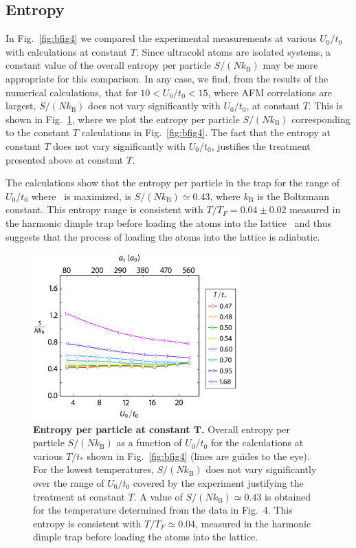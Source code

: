 \subsection{Entropy}


In Fig.~\ref{fig:bfig4} we compared the experimental measurements at various
$U_{0}/t_{0}$ with calculations at constant $T$.   Since ultracold atoms are
isolated systems, a constant value of the overall entropy per particle $S/(N
k_{\mathrm{B}})$ may be more appropriate for this comparison.  In any case,  we
find, from the results of the numerical calculations, that for
$10<U_{0}/t_{0}<15$, where AFM correlations are largest,  $S/(N
k_{\mathrm{B}})$ does not vary significantly with $U_{0}/t_{0}$, at constant
$T$.  This is shown in Fig.~\ref{fig:entropy-ED6}, where we plot the entropy
per particle $S/(Nk_{\mathrm{B}})$ corresponding to the constant $T$
calculations in Fig.~\ref{fig:bfig4}.  The fact that the entropy at constant
$T$ does not vary significantly with $U_{0}/t_{0}$, justifies the treatment
presented above at constant $T$. 
 
The calculations show that the entropy per particle in the trap for the range
of $U_{0}/t_{0}$ where \sPi\ is maximized,  is $S/(Nk_{\mathrm{B}})\simeq0.43$,
where $k_{\mathrm{B}}$ is the Boltzmann constant.  This entropy range is
consistent with $T/T_{F}=0.04\pm0.02$ measured in the harmonic dimple trap
before loading the atoms into the lattice~\cite{Kohl2006} and thus suggests
that the process of loading the atoms into the lattice is adiabatic. 

\begin{figure}
\centering \includegraphics[width=80mm]{../figures/afmpaper/Hulet_EDfig6.png}
\caption{\textbf{Entropy per particle at constant $\bm{T}$.} Overall entropy
per particle $S/(Nk_{\mathrm{B}})$ as a function of $U_{0}/t_{0}$ for the
calculations at various $T/t_{*}$ shown in Fig.~\ref{fig:bfig4} (lines are
guides to the eye).  For the lowest temperatures, $S/(Nk_{\mathrm{B}})$ does
not vary significantly over the range of $U_{0}/t_{0}$ covered by the
experiment justifying the treatment at constant $T$.   A value of
$S/(Nk_{\mathrm{B}})\simeq0.43$ is obtained for the temperature determined from
the data in Fig.~4. This entropy is consistent with $T/T_{F}\simeq 0.04$,
measured in the harmonic dimple trap before loading the atoms into the
lattice.}
\label{fig:entropy-ED6}
\end{figure}


